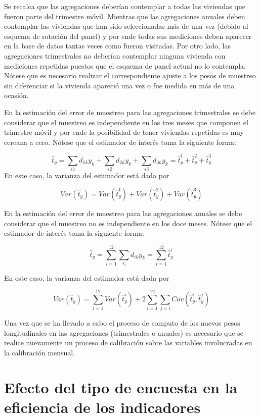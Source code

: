 \documentclass[12pt,spanish,]{book}
\begin{document}
Se recalca que las agregaciones deberían contemplar a todas las viviendas que fueron parte del trimestre móvil. Mientras que las agregaciones anuales deben contemplar las viviendas que han sido seleccionadas más de una vez (debido al esquema de rotación del panel) y por ende todas sus mediciones deben aparecer en la base de datos tantas veces como fueron visitadas. Por otro lado, las agregaciones trimestrales no deberían contemplar ninguna vivienda con mediciones repetidas puestos que el esquema de panel actual no lo contempla. Nótese que es necesario realizar el correspondiente ajuste a los pesos de muestreo sin diferenciar si la vivienda apareció una vez o fue medida en más de una ocasión.

En la estimación del error de muestreo para las agregaciones trimestrales se debe considerar que el muestreo es independiente en los tres meses que componen el trimestre móvil y por ende la posibilidad de tener viviendas repetidas es muy cercana a cero. Nótese que el estimador de interés toma la siguiente forma:

\[
\hat{t}_y 
= \sum_{s1} d_{1k} y_k + \sum_{s2} d_{2k} y_k + \sum_{s3} d_{3k} y_k
= \hat{t}_{y}^1 + \hat{t}_{y}^2 + \hat{t}_{y}^3
\]
En este caso, la varianza del estimador está dada por

\[
Var(\hat{t}_y)
= Var(\hat{t}_{y}^1) + Var(\hat{t}_{y}^2) + Var(\hat{t}_{y}^3)
\]

En la estimación del error de muestreo para las agregaciones anuales se debe considerar que el muestreo no es independiente en los doce meses. Nótese que el estimador de interés toma la siguiente forma:

\[
\hat{t}_y 
= \sum_{i=1}^{12}\sum_{s_i} d_{ik} y_k 
= \sum_{i=1}^{12} \hat{t}_{y}^i
\]

En este caso, la varianza del estimador está dada por

\[
Var(\hat{t}_y) 
= \sum_{i=1}^{12} Var(\hat{t}_{y}^i)
+ 2 \sum_{i=1}^{12} \sum_{j < i} Cov(\hat{t}_{y}^i, \hat{t}_{y}^j)
\]

Una vez que se ha llevado a cabo el proceso de computo de los nuevos pesos longitudinales en las agregaciones (trimestrales o anuales) es necesario que se realice nuevamente un proceso de calibración sobre las variables involucradas en la calibración mensual.

\hypertarget{efecto-del-tipo-de-encuesta-en-la-eficiencia-de-los-indicadores}{%
\section{Efecto del tipo de encuesta en la eficiencia de los indicadores}\label{efecto-del-tipo-de-encuesta-en-la-eficiencia-de-los-indicadores}}
\end{document}
